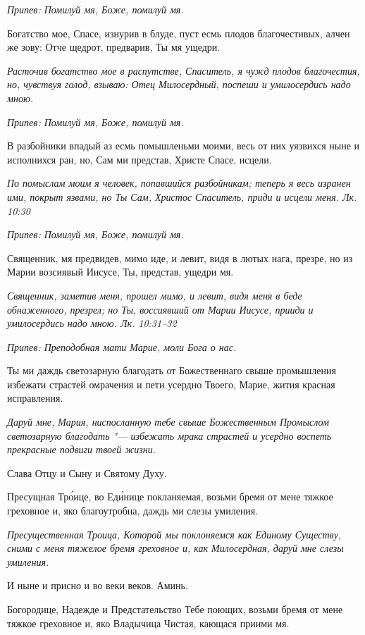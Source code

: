 \itshape Припев:\normalfont{} Помилуй мя, Боже, помилуй мя.


Богатство мое, Спасе, изнурив в блуде, пуст есмь плодов благочестивых, алчен же зову: Отче щедрот, предварив, Ты мя ущедри.


\itshape Расточив богатство мое в распутстве, Спаситель, я чужд плодов благочестия, но, чувствуя голод, взываю: Отец Милосердный, поспеши и умилосердись надо мною.\normalfont{}


\itshape Припев:\normalfont{} Помилуй мя, Боже, помилуй мя.


В разбойники впадый аз есмь помышленьми моими, весь от них уязвихся ныне и исполнихся ран, но, Сам ми представ, Христе Спасе, исцели.


\itshape По помыслам моим я человек, попавшийся разбойникам; теперь я весь изранен ими, покрыт язвами, но Ты Сам, Христос Спаситель, приди и исцели меня. Лк. 10:30\normalfont{}


\itshape Припев:\normalfont{} Помилуй мя, Боже, помилуй мя.


Священник, мя предвидев, мимо иде, и левит, видя в лютых нага, презре, но из Марии возсиявый Иисусе, Ты, представ, ущедри мя.


\itshape Священник, заметив меня, прошел мимо, и левит, видя меня в беде обнаженного, презрел; но Ты, воссиявший от Марии Иисусе, прииди и умилосердись надо мною. Лк. 10:31–32\normalfont{}


\itshape Припев:\normalfont{} Преподобная мати Марие, моли Бога о нас.


Ты ми даждь светозарную благодать от Божественнаго свыше промышления избежати страстей омрачения и пети усердно Твоего, Марие, жития красная исправления.


\itshape Даруй мне, Мария, ниспосланную тебе свыше Божественным Промыслом светозарную благодать "--- избежать мрака страстей и усердно воспеть прекрасные подвиги твоей жизни.\normalfont{}


Слава Отцу и Сыну и Святому Духу.


Пресущная Тро́ице, во Еди́нице покланяемая, возьми бремя от мене тяжкое греховное и, яко благоутробна, даждь ми слезы умиления.


\itshape Пресущественная Троица, Которой мы поклоняемся как Единому Существу, сними с меня тяжелое бремя греховное и, как Милосердная, даруй мне слезы умиления.\normalfont{}


И ныне и присно и во веки веков. Аминь.


Богородице, Надежде и Предстательство Тебе поющих, возьми бремя от мене тяжкое греховное и, яко Владычица Чистая, кающася приими мя.


